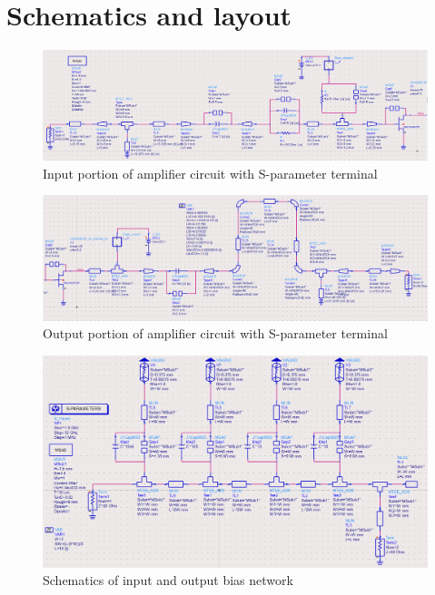 \chapter{Schematics and layout}

  \begin{figure}[h]
	  \centering
	  \includegraphics[width=\textwidth]{img/Circuit_input}
	  \caption{Input portion of amplifier circuit with S-parameter terminal}
	  \label{fig:Schem_Input}
  \end{figure}

  \begin{figure}[H]
	  \centering
	  \includegraphics[width=\textwidth]{img/Circuit_output}
	  \caption{Output portion of amplifier circuit with S-parameter terminal}
	  \label{fig:Schem_Output}
  \end{figure}

  
  \begin{figure}[h]
	  \centering
	  \includegraphics[width=\textwidth]{img/Bias_filter_two_port}
	  \caption{Schematics of input and output bias network}
	  \label{fig:Schem_Bias}
  \end{figure}

